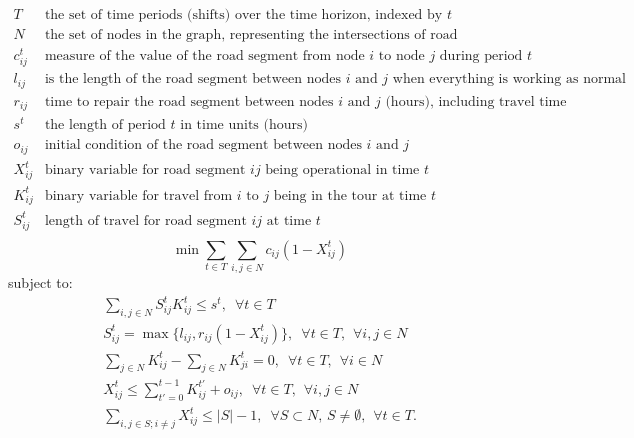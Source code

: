 \documentclass{article}
\begin{document}
\begin{displaymath}
\begin{array}{ll}
T & \mbox{the set of time periods (shifts) over the time horizon, indexed by $t$}\\
N & \mbox{the set of nodes in the graph, representing the intersections of road segments}\\
c_{ij}^t & \mbox{measure of the value of the road segment from node $i$ to node $j$ during period $t$}\\
l_{ij} & \mbox{is the length of the road segment between nodes $i$ and $j$ when everything is working as normal}\\
r_{ij} & \mbox{time to repair the road segment between nodes $i$ and $j$ (hours), including travel time}\\
s^t & \mbox{the length of period $t$ in time units (hours)}\\
o_{ij} & \mbox{initial condition of the road segment between nodes $i$ and $j$}\\
X_{ij}^t & \mbox{binary variable for road segment $ij$ being operational in time $t$}\\
K_{ij}^t & \mbox{binary variable for travel from $i$ to $j$ being in the tour at time $t$}\\
S_{ij}^t & \mbox{length of travel for road segment $ij$ at time $t$}\\
\end{array}
\end{displaymath}	
\begin{equation}
\min \sum_{t \in T}  \sum_{i,j \in N} c_{ij}(1-X_{ij}^t) 
\end{equation}
subject to:
\begin{eqnarray}
\sum_{i,j \in N} S_{ij}^t K_{ij}^t \leq s^t, \hspace{6pt} \forall t\in T \\
S_{ij}^t = \max \{l_{ij}, r_{ij}(1-X_{ij}^t) \}, \hspace{6pt} \forall t\in T, \hspace{5pt} \forall i,j \in N\\
\sum_{j \in N} K_{ij}^t - \sum_{j \in N} K_{ji}^t = 0, \hspace{6pt} \forall t\in T, \hspace{5pt} \forall i \in N\\
X_{ij}^t \le \sum_{t'=0}^{t-1} K_{ij}^{t'} + o_{ij} , \hspace{6pt} \forall t\in T,  \hspace{5pt} \forall i,j \in N\\
\sum_{i,j \in S; i\neq j} X_{ij}^t \leq |S|-1, \hspace{6pt} \forall S \subset N, \hspace{2pt} S \neq \emptyset, \hspace{5pt} \forall t\in T.
\end{eqnarray}
\end{document}
